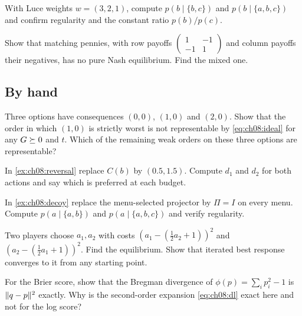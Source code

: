 \begin{exercise}\label{exr:ch08:luce}
With Luce weights $w=(3,2,1)$, compute $p(b\mid\{b,c\})$ and $p(b\mid\{a,b,c\})$ and confirm regularity and the constant ratio $p(b)/p(c)$.
\end{exercise}

\begin{exercise}\label{exr:ch08:pennies}
Show that matching pennies, with row payoffs $\begin{pmatrix}1&-1\\-1&1\end{pmatrix}$ and column payoffs their negatives, has no pure Nash equilibrium. Find the mixed one.
\end{exercise}

\subsection*{By hand}

\begin{exercise}\label{exr:ch08:hull}
Three options have consequences $(0,0)$, $(1,0)$ and $(2,0)$. Show that the order in which $(1,0)$ is strictly worst is not representable by \eqref{eq:ch08:ideal} for any $G\succeq0$ and $t$. Which of the remaining weak orders on these three options are representable?
\end{exercise}

\begin{exercise}\label{exr:ch08:reversal}
In \cref{ex:ch08:reversal} replace $C(b)$ by $(0.5,1.5)$. Compute $d_1$ and $d_2$ for both actions and say which is preferred at each budget.
\end{exercise}

\begin{exercise}\label{exr:ch08:fixed}
In \cref{ex:ch08:decoy} replace the menu-selected projector by $\Pi=I$ on every menu. Compute $p(a\mid\{a,b\})$ and $p(a\mid\{a,b,c\})$ and verify regularity.
\end{exercise}

\begin{exercise}\label{exr:ch08:sym}
Two players choose $a_1,a_2$ with costs $(a_1-(\tfrac12a_2+1))^2$ and $(a_2-(\tfrac12a_1+1))^2$. Find the equilibrium. Show that iterated best response converges to it from any starting point.
\end{exercise}

\begin{exercise}\label{exr:ch08:brier}
For the Brier score, show that the Bregman divergence of $\phi(p)=\sum_ip_i^2-1$ is $\lVert q-p\rVert^2$ exactly. Why is the second-order expansion \eqref{eq:ch08:dl} exact here and not for the log score?
\end{exercise}


